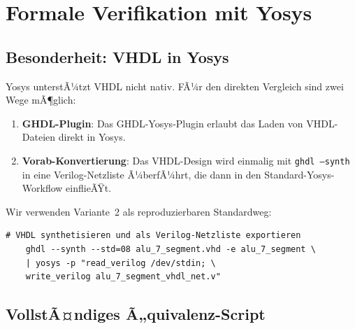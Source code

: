 ﻿\documentclass[12pt,a4paper]{report}
\begin{document}
\section{Formale Verifikation mit Yosys}
\label{subsec:yosys_direkt}

\subsection{Besonderheit: VHDL in Yosys}

Yosys unterstÃ¼tzt VHDL nicht nativ.  FÃ¼r den direkten Vergleich sind zwei
Wege mÃ¶glich:

\begin{enumerate}
	\item \textbf{GHDL-Plugin}: Das GHDL-Yosys-Plugin \cite{ghdl2024} erlaubt
	das Laden von VHDL-Dateien direkt in Yosys.
	\item \textbf{Vorab-Konvertierung}: Das VHDL-Design wird einmalig mit
	\texttt{ghdl --synth} in eine Verilog-Netzliste Ã¼berfÃ¼hrt, die dann
	in den Standard-Yosys-Workflow einflieÃŸt.
\end{enumerate}

Wir verwenden Variante~2 als reproduzierbaren Standardweg:

\begin{lstlisting}[style=bashstyle, caption={VHDL zu Verilog via GHDL-Synthese}]
	# VHDL synthetisieren und als Verilog-Netzliste exportieren
	ghdl --synth --std=08 alu_7_segment.vhd -e alu_7_segment \
	| yosys -p "read_verilog /dev/stdin; \
	write_verilog alu_7_segment_vhdl_net.v"
\end{lstlisting}

\subsection{VollstÃ¤ndiges Ã„quivalenz-Script}
\end{document}
